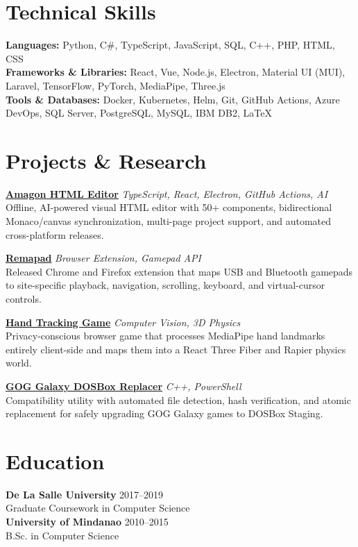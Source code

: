\documentclass[11pt,letterpaper]{article}
\begin{document}
\section{Technical Skills}
\noindent
\textbf{Languages:} Python, C\#, TypeScript, JavaScript, SQL, C++, PHP, HTML, CSS \\
\textbf{Frameworks \& Libraries:} React, Vue, Node.js, Electron, Material UI (MUI), Laravel, TensorFlow, PyTorch, MediaPipe, Three.js \\
\textbf{Tools \& Databases:} Docker, Kubernetes, Helm, Git, GitHub Actions, Azure DevOps, SQL Server, PostgreSQL, MySQL, IBM DB2, \LaTeX

\section{Projects \& Research}
\noindent
\href{https://github.com/Shin-Aska/amagon-html-editor}{\textbf{Amagon HTML Editor}} \hfill \textit{TypeScript, React, Electron, GitHub Actions, AI} \\
Offline, AI-powered visual HTML editor with 50+ components, bidirectional Monaco/canvas synchronization, multi-page project support, and automated cross-platform releases.

\vspace{4pt}
\noindent
\href{https://gitlab.com/ShinAska/remapad}{\textbf{Remapad}} \hfill \textit{Browser Extension, Gamepad API} \\
Released Chrome and Firefox extension that maps USB and Bluetooth gamepads to site-specific playback, navigation, scrolling, keyboard, and virtual-cursor controls.

\vspace{4pt}
\noindent
\href{https://github.com/Shin-Aska/poc-camera-ml}{\textbf{Hand Tracking Game}} \hfill \textit{Computer Vision, 3D Physics} \\
Privacy-conscious browser game that processes MediaPipe hand landmarks entirely client-side and maps them into a React Three Fiber and Rapier physics world.

\vspace{4pt}
\noindent
\href{https://github.com/Shin-Aska/DosboxStagingReplacerForGOGGalaxy}{\textbf{GOG Galaxy DOSBox Replacer}} \hfill \textit{C++, PowerShell} \\
Compatibility utility with automated file detection, hash verification, and atomic replacement for safely upgrading GOG Galaxy games to DOSBox Staging.

\section{Education}
\noindent
\textbf{De La Salle University} \hfill 2017--2019 \\
Graduate Coursework in Computer Science \\
\vspace{4pt}
\noindent
\textbf{University of Mindanao} \hfill 2010--2015 \\
B.Sc. in Computer Science
\end{document}
